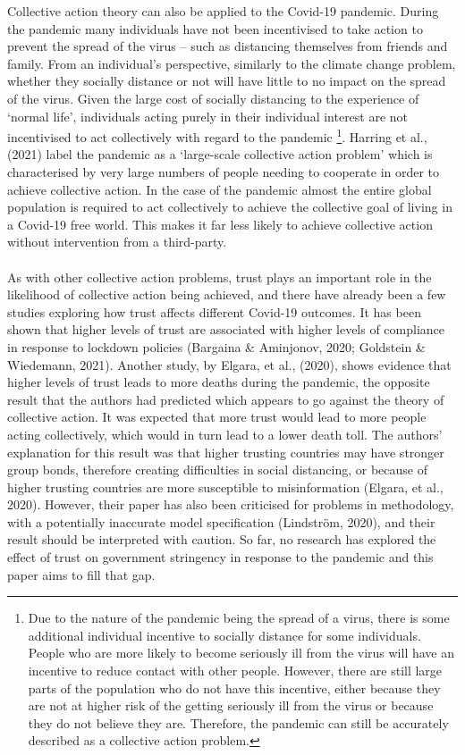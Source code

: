 \documentclass[
  11pt,
]{article}
\begin{document}
Collective action theory can also be applied to the Covid-19 pandemic. During the pandemic many individuals have not been incentivised to take action to prevent the spread of the virus -- such as distancing themselves from friends and family. From an individual's perspective, similarly to the climate change problem, whether they socially distance or not will have little to no impact on the spread of the virus. Given the large cost of socially distancing to the experience of `normal life', individuals acting purely in their individual interest are not incentivised to act collectively with regard to the pandemic \footnote{Due to the nature of the pandemic being the spread of a virus, there is some additional individual incentive to socially distance for some individuals. People who are more likely to become seriously ill from the virus will have an incentive to reduce contact with other people. However, there are still large parts of the population who do not have this incentive, either because they are not at higher risk of the getting seriously ill from the virus or because they do not believe they are. Therefore, the pandemic can still be accurately described as a collective action problem.}. Harring et al., (2021) label the pandemic as a `large-scale collective action problem' which is characterised by very large numbers of people needing to cooperate in order to achieve collective action. In the case of the pandemic almost the entire global population is required to act collectively to achieve the collective goal of living in a Covid-19 free world. This makes it far less likely to achieve collective action without intervention from a third-party.\\
~\\
As with other collective action problems, trust plays an important role in the likelihood of collective action being achieved, and there have already been a few studies exploring how trust affects different Covid-19 outcomes. It has been shown that higher levels of trust are associated with higher levels of compliance in response to lockdown policies (Bargaina \& Aminjonov, 2020; Goldstein \& Wiedemann, 2021). Another study, by Elgara, et al., (2020), shows evidence that higher levels of trust leads to more deaths during the pandemic, the opposite result that the authors had predicted which appears to go against the theory of collective action. It was expected that more trust would lead to more people acting collectively, which would in turn lead to a lower death toll. The authors' explanation for this result was that higher trusting countries may have stronger group bonds, therefore creating difficulties in social distancing, or because of higher trusting countries are more susceptible to misinformation (Elgara, et al., 2020). However, their paper has also been criticised for problems in methodology, with a potentially inaccurate model specification (Lindström, 2020), and their result should be interpreted with caution. So far, no research has explored the effect of trust on government stringency in response to the pandemic and this paper aims to fill that gap.\\
\end{document}
